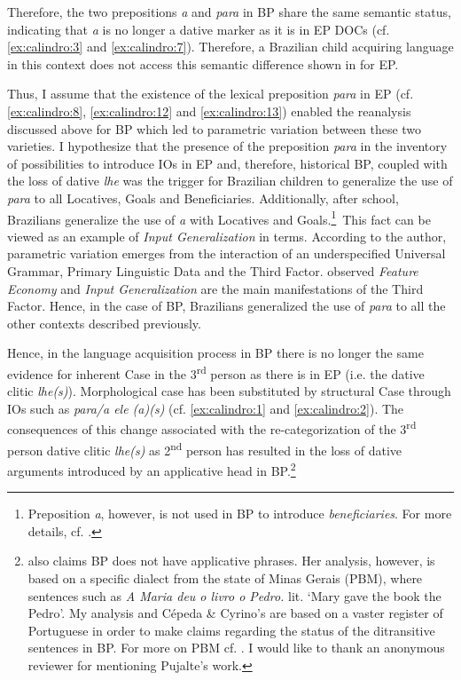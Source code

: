 \documentclass[output=paper,colorlinks,citecolor=brown,modfonts,nonflat]{langsci/langscibook}
\begin{document}
Therefore, the two prepositions \textit{a} and \textit{para} in BP share the same semantic status, indicating that \textit{a} is no longer a dative marker as it is in EP DOCs (cf. \ref{ex:calindro:3} and \ref{ex:calindro:7}). Therefore, a Brazilian child acquiring language in this context does not access this semantic difference shown in  for EP.

Thus, I assume that the existence of the lexical preposition \textit{para} in EP (cf. \ref{ex:calindro:8}, \ref{ex:calindro:12} and \ref{ex:calindro:13}) enabled the reanalysis discussed above for BP which led to parametric variation between these two varieties. I hypothesize that the presence of the preposition \textit{para} in the inventory of possibilities to introduce IOs in EP and, therefore, historical BP, coupled with the loss of dative \textit{lhe} was the trigger for Brazilian children to generalize the use of \textit{para} to all Locatives, Goals and Beneficiaries. Additionally, after school, Brazilians generalize the use of \textit{a} with Locatives and Goals.\footnote{Preposition \textit{a}, however, is not used in BP to introduce \textit{beneficiaries}. For more details, cf. \citet{Calindro2015}.}~This fact can be viewed as an example of \textit{Input Generalization} in  terms. According to the author, parametric variation emerges from the interaction of an underspecified Universal Grammar, Primary Linguistic Data and the Third Factor. \citet{BiberauerRoberts2015} observed \textit{Feature Economy} and \textit{Input Generalization} are the main manifestations of the Third Factor. Hence, in the case of BP, Brazilians generalized the use of \textit{para} to all the other contexts described previously.

Hence, in the language acquisition process in BP there is no longer the same evidence for inherent Case in the 3\textsuperscript{rd} person as there is in EP (i.e. the dative clitic \textit{lhe(s)}). Morphological case has been substituted by structural Case through IOs such as \textit{para/a ele (a)(s)} (cf. \ref{ex:calindro:1} and \ref{ex:calindro:2}). The consequences of this change associated with the re-categorization of the 3\textsuperscript{rd} person dative clitic \textit{lhe(s)} as 2\textsuperscript{nd} person has resulted in the loss of dative arguments introduced by an applicative head in BP.\footnote{\citet{Pujalte2010} also claims BP does not have applicative phrases. Her analysis, however, is based on a specific dialect from the state of Minas Gerais (PBM), where sentences such as
\textit{A Maria deu o livro o Pedro.}
lit. ‘Mary gave the book the Pedro’. My analysis and Cépeda \& Cyrino’s are based on a vaster register of Portuguese in order to make claims regarding the status of the ditransitive sentences in BP. For more on PBM cf. \citet{Scher1996, TorresMoraisSalles2010}. I would like to thank an anonymous reviewer for mentioning Pujalte’s work.}
\end{document}
